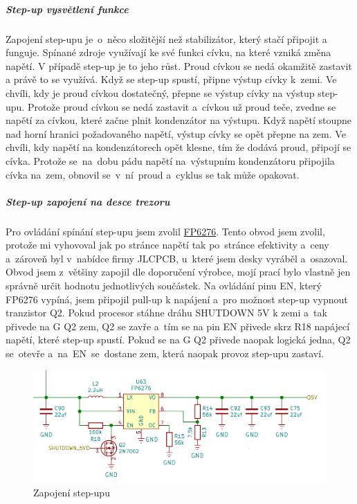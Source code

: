 \subparagraph*{Step-up vysvětlení funkce}
Zapojení step-upu je~o~něco složitější než stabilizátor, který stačí připojit a funguje. Spínané zdroje využívají ke své funkci cívku, na které
vzniká změna napětí. V případě step-up je to jeho růst. Proud cívkou se nedá okamžitě zastavit a právě to se využívá. 
Když se step-up spustí, připne výstup cívky k~zemi. Ve chvíli, kdy je proud cívkou dostatečný, přepne se výstup cívky na výstup step-upu.
Protože proud cívkou se nedá zastavit a~cívkou už proud teče, zvedne se napětí za cívkou, které začne plnit kondenzátor na výstupu.
Když napětí stoupne nad horní hranici požadovaného napětí, výstup cívky se opět přepne na zem. Ve chvíli, kdy napětí na kondenzátorech opět 
klesne, tím že dodává proud, připojí se cívka. Protože se~na~dobu pádu napětí na~výstupním kondenzátoru připojila cívka na~zem, obnovil 
se~v~ní~proud a~cyklus se tak může opakovat.


\subparagraph*{Step-up zapojení na desce trezoru} 

Pro ovládání spínání step-upu jsem zvolil \href{https://datasheet.lcsc.com/szlcsc/Feeling-Tech-FP6276AXR-G1_C83308.pdf}{FP6276}.
Tento obvod jsem zvolil, protože mi vyhovoval jak po stránce napětí tak po~stránce efektivity a~ceny a~zároveň byl v~nabídce firmy JLCPCB,
u~které jsem desky vyráběl a~osazoval. 
Obvod jsem z~většiny zapojil dle doporučení výrobce, mojí prací bylo vlastně jen správně určit hodnotu 
jednotlivých součástek. Na ovládání pinu EN, který FP6276 vypíná, jsem připojil pull-up k napájení a~pro možnost step-up vypnout tranzistor Q2. 
Pokud procesor stáhne dráhu SHUTDOWN 5V k zemi a~tak přivede na G Q2 zem, Q2 se zavře a~tím se na pin EN přivede skrz R18 napájecí napětí, 
které step-up spustí. Pokud se na G Q2 přivede naopak logická jedna, Q2 se~otevře a~na~EN~se~dostane zem, která naopak provoz step-upu zastaví.

\begin{figure}[htbp]
    \centering
    \includegraphics[width=400pt]{kapitoly/obrazky/E4/napajeni/step-up.png}
    \caption{Zapojení step-upu}
    \label{fig:E4-step-up}
\end{figure}

